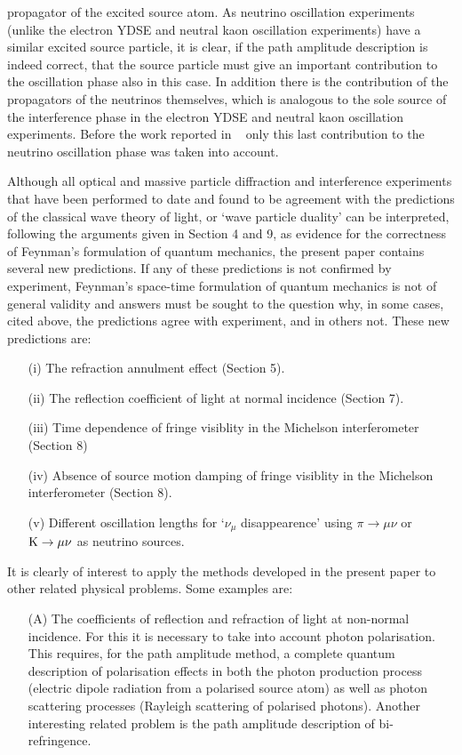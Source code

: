 \documentclass [12pt]{article}
\begin{document}
{  propagator of the excited source atom. As neutrino oscillation experiments
   (unlike the electron YDSE and neutral kaon oscillation experiments)  
  have a similar excited source particle, it is clear, if the path
   amplitude description is indeed correct, that the source particle must give 
  an important contribution to the oscillation phase also in this case. In addition there is the
  contribution of the propagators of the neutrinos themselves, which is analogous
  to the sole source of the interference phase in the electron YDSE and neutral
   kaon oscillation experiments. Before the work reported in ~\cite{JHF1,JHF2,JHF3}
   only this last contribution to the neutrino oscillation phase was taken into account.
   \par Although all optical and massive particle diffraction and interference experiments that
   have been performed
    to date
   and found to be agreement with the predictions of the classical wave theory of light,
   or `wave particle duality'
   can be interpreted, following the arguments given in Section 4 and 9, as evidence for
    the correctness
  of Feynman's formulation of quantum mechanics, the present paper contains several new
  predictions. If any of these predictions is not confirmed by experiment,
   Feynman's space-time formulation of quantum mechanics is not of general validity
  and answers must be sought to the question why, in some cases, cited above,
   the predictions agree with experiment, and in others not. 
   These new predictions are:
 \begin{itemize}
  \item[(i)] The refraction annulment effect (Section 5).
 \item[(ii)] The reflection coefficient of light
            at normal incidence (Section 7).
  \item[(iii)] Time dependence of fringe visiblity in the
               Michelson interferometer (Section 8)
 \item[(iv)] Absence of source motion damping of fringe visiblity in the
               Michelson interferometer (Section 8).
  \item[(v)] Different oscillation lengths for `$\nu_{\mu}$ disappearence' using $\pi \rightarrow \mu \nu$
       or ${\rm K} \rightarrow \mu \nu$ as neutrino sources.
 \end{itemize}
 \par It is clearly of interest to apply the methods developed in the present paper to 
  other related physical problems. Some examples are:
  \begin{itemize}
   \item[(A)] The coefficients of reflection and refraction of light at non-normal incidence.
    For this it is necessary to take into account photon polarisation. This requires, for the 
    path amplitude method, a complete quantum description of polarisation effects
    in both the photon production process (electric dipole radiation from a polarised source 
    atom) as well as photon scattering processes (Rayleigh scattering of polarised photons).
    Another interesting related problem is the path amplitude description of bi-refringence.


\end{itemize}}
\end{document}
